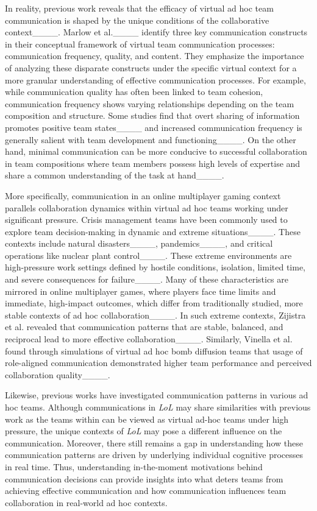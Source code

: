 In reality, previous work reveals that the efficacy of virtual ad hoc team communication is shaped by the unique conditions of the collaborative context____. Marlow et al.____ identify three key communication constructs in their conceptual framework of virtual team communication processes: communication frequency, quality, and content. They emphasize the importance of analyzing these disparate constructs under the specific virtual context for a more granular understanding of effective communication processes. For example, while communication quality has often been linked to team cohesion, communication frequency shows varying relationships depending on the team composition and structure. Some studies find that overt sharing of information promotes positive team states____ and increased communication frequency is generally salient with team development and functioning____. On the other hand, minimal communication can be more conducive to successful collaboration in team compositions where team members possess high levels of expertise and share a common understanding of the task at hand____.

More specifically, communication in an online multiplayer gaming context parallels collaboration dynamics within virtual ad hoc teams working under significant pressure. Crisis management teams have been commonly used to explore team decision-making in dynamic and extreme situations____. These contexts include natural disasters____, pandemics____, and critical operations like nuclear plant control____. These extreme environments are high-pressure work settings defined by hostile conditions, isolation, limited time, and severe consequences for failure____. Many of these characteristics are mirrored in online multiplayer games, where players face time limits and immediate, high-impact outcomes, which differ from traditionally studied, more stable contexts of ad hoc collaboration____. In such extreme contexts, Zijistra et al. revealed that communication patterns that are stable, balanced, and reciprocal lead to more effective collaboration____. Similarly, Vinella et al. found through simulations of virtual ad hoc bomb diffusion teams that usage of role-aligned communication demonstrated higher team performance and perceived collaboration quality____.

Likewise, previous works have investigated communication patterns in various ad hoc teams. Although communications in \textit{LoL} may share similarities with previous work as the teams within can be viewed as virtual ad-hoc teams under high pressure, the unique contexts of \textit{LoL} may pose a different influence on the communication. 
Moreover, there still remains a gap in understanding how these communication patterns are driven by underlying individual cognitive processes in real time. Thus, understanding in-the-moment motivations behind communication decisions can provide insights into what deters teams from achieving effective communication and how communication influences team collaboration in real-world ad hoc contexts.

